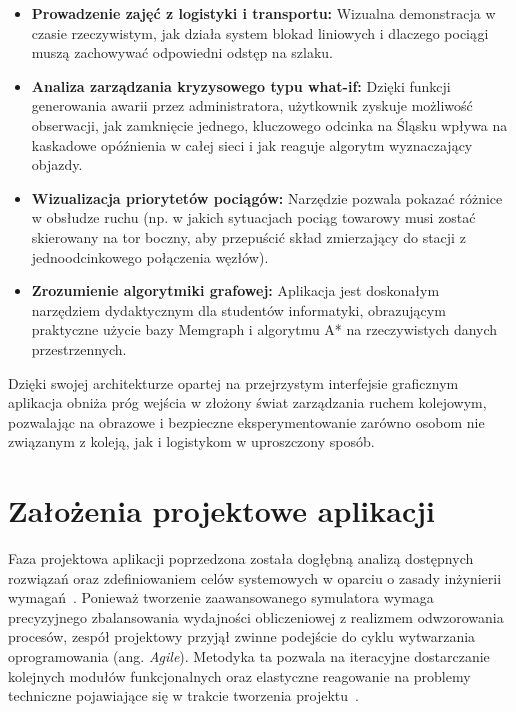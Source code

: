 \documentclass[twoside]{projektInzynierskiMS1z}
\begin{document}
\begin{itemize}
\item \textbf{Prowadzenie zajęć z logistyki i transportu:} Wizualna demonstracja
w czasie rzeczywistym, jak działa system blokad liniowych i dlaczego pociągi muszą
zachowywać odpowiedni odstęp na szlaku.

\item \textbf{Analiza zarządzania kryzysowego typu what-if:} Dzięki funkcji
generowania awarii przez administratora, użytkownik zyskuje możliwość obserwacji,
jak zamknięcie jednego, kluczowego odcinka na Śląsku wpływa na kaskadowe opóźnienia
w całej sieci i jak reaguje algorytm wyznaczający objazdy.

\item \textbf{Wizualizacja priorytetów pociągów:} Narzędzie pozwala pokazać różnice
w obsłudze ruchu (np. w jakich sytuacjach pociąg towarowy musi zostać skierowany na
tor boczny, aby przepuścić skład zmierzający do stacji z jednoodcinkowego połączenia węzłów).

\item \textbf{Zrozumienie algorytmiki grafowej:} Aplikacja jest doskonałym narzędziem
dydaktycznym dla studentów informatyki, obrazującym praktyczne użycie bazy Memgraph
i algorytmu A* na rzeczywistych danych przestrzennych.
\end{itemize}

Dzięki swojej architekturze opartej na przejrzystym interfejsie graficznym aplikacja
obniża próg wejścia w złożony świat zarządzania ruchem kolejowym, pozwalając na obrazowe i
bezpieczne eksperymentowanie zarówno osobom nie związanym z koleją, jak i logistykom w uproszczony sposób.

\section{Założenia projektowe aplikacji}

Faza projektowa aplikacji poprzedzona została dogłębną analizą dostępnych rozwiązań
oraz zdefiniowaniem celów systemowych w oparciu o zasady inżynierii
wymagań~\cite{sommerville2016}. Ponieważ tworzenie zaawansowanego symulatora wymaga
precyzyjnego zbalansowania wydajności obliczeniowej z realizmem odwzorowania procesów,
zespół projektowy przyjął zwinne podejście do cyklu wytwarzania oprogramowania
(ang. \emph{Agile}). Metodyka ta pozwala na iteracyjne dostarczanie kolejnych
modułów funkcjonalnych oraz elastyczne reagowanie na problemy techniczne pojawiające
się w trakcie tworzenia projektu~\cite{agilemanifesto}.
\end{document}
